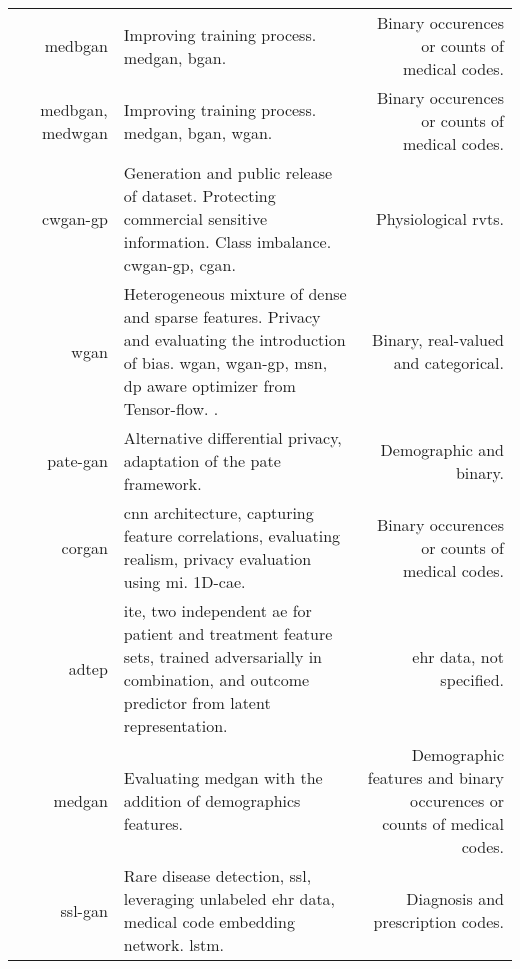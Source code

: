 \begin{center}
\begin{longtable}[l]{@{}p{}NMR@{}}
        \citeauthor{baowaly_2019_IEEE} & \gls{medbgan}
        & Improving training process. \gls{medgan}, \gls{bgan}.
        & Binary occurences or counts of medical codes.\\
        
        \citeauthor{baowaly_2019_jamia} & \gls{medbgan}, \gls{medwgan}
        & Improving training process. \gls{medgan}, \gls{bgan}, \gls{wgan}.
        & Binary occurences or counts of medical codes.\\
        
        \citeauthor{severo2019ward2icu} & \gls{cwgan-gp} 
        & Generation and public release of dataset. Protecting commercial sensitive information. Class imbalance. \gls{cwgan-gp}, \gls{cgan}.
        & Physiological \gls{rvts}.\\
        
        \citeauthor{chin2019generation} & \gls{wgan}
        & Heterogeneous mixture of dense and sparse features. Privacy and evaluating the introduction of bias. \gls{wgan}, \gls{wgan-gp}, \gls{msn}, \gls{dp} aware optimizer from Tensor-flow. \citeauthor{tensorflow-privacy}.
        & Binary, real-valued and categorical.\\
        
        \citeauthor{Jordon2019} & \gls{pate-gan}
        & Alternative differential privacy, adaptation of the  \gls{pate} framework.
        & Demographic and binary.\\
        
        \citeauthor{torfi2019generating} & \gls{corgan}
        & \gls{cnn} architecture, capturing feature correlations, evaluating realism, privacy evaluation using \gls{mi}. 1D-\gls{cae}.
        & Binary occurences or counts of medical codes.\\
    
        \citeauthor{chu2019treatment} & \gls{adtep}
        & \gls{ite}, two independent \gls{ae} for patient and treatment feature sets, trained adversarially in combination, and outcome predictor from latent representation. &
         \Gls{ehr} data, not specified.\\
        
        \citeauthor{Jackson_2019} & \gls{medgan}
        & Evaluating medgan with the addition of demographics features.
        & Demographic features and binary occurences or counts of medical codes. \\
        
        \citeauthor{yu2019rare} & \gls{ssl-gan}
        & Rare disease detection, \gls{ssl}, leveraging unlabeled \gls{ehr} data, medical code embedding network.  \gls{lstm}.
        & Diagnosis and prescription codes.\\
        

\end{longtable}
\end{center}
